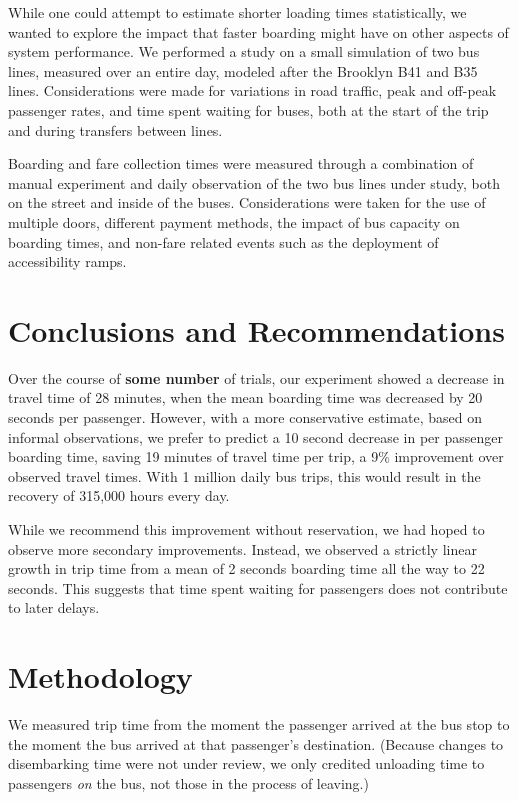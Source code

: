 \documentclass[12pt]{article}
\begin{document}
While one could attempt to estimate shorter loading times statistically, we
wanted to explore the impact that faster boarding might have on other aspects
of system performance. We performed a study on a small simulation of two bus
lines, measured over an entire day, modeled after the Brooklyn B41 and B35
lines. Considerations were made for variations in road traffic, peak and
off-peak passenger rates, and time spent waiting for buses, both at the start
of the trip and during transfers between lines.

Boarding and fare collection times were measured through a combination of
manual experiment and daily observation of the two bus lines under study, both
on the street and inside of the buses. Considerations were taken for the use
of multiple doors, different payment methods, the impact of bus capacity on
boarding times, and non-fare related events such as the deployment of
accessibility ramps.

\section{Conclusions and Recommendations}

Over the course of \textbf{some number} of trials, our experiment showed a decrease
in travel time of 28 minutes, when the mean boarding time was decreased by 20
seconds per passenger. However, with a more conservative estimate, based on
informal observations, we prefer to predict a 10 second decrease in per
passenger boarding time, saving 19 minutes of travel time per trip, a 9\%
improvement over observed travel times. With 1 million daily bus trips, this
would result in the recovery of 315,000 hours every day.

While we recommend this improvement without reservation, we had hoped to
observe more secondary improvements. Instead, we observed a strictly linear
growth in trip time from a mean of 2 seconds boarding time all the way to 22
seconds. This suggests that time spent waiting for passengers does not
contribute to later delays.

\section{Methodology}

We measured trip time from the moment the passenger arrived at the bus stop to
the moment the bus arrived at that passenger's destination. (Because changes
to disembarking time were not under review, we only credited unloading time to
passengers \emph{on} the bus, not those in the process of leaving.)
\end{document}
